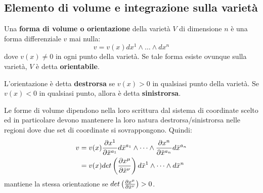 \subsection{Elemento di volume e integrazione sulla varietà}\label{para.volume}
\begin{definizione}
Una \textbf{forma di volume o orientazione} della varietà $V$ di dimensione $n$ è una forma differenziale $v$ mai nulla:
\begin{equation*}
    v = v(x)dx^1\wedge \dots \wedge dx^n
\end{equation*}
dove $v(x)\neq 0$ in ogni punto della varietà. Se tale forma esiste ovunque sulla varietà, $V$ è detta \textbf{orientabile}.
\end{definizione}

\begin{definizione}
L'orientazione è detta \textbf{destrorsa} se $v(x) > 0$ in qualsiasi punto della varietà. Se $v(x) < 0 $ in qualsiasi punto, allora è detta \textbf{sinistrorsa}.
\end{definizione}

Le forme di volume dipendono nella loro scrittura dal sistema di coordinate scelto ed in particolare devono mantenere la loro natura destrorsa/sinistrorsa nelle regioni dove due set di coordinate si sovrappongono. Quindi:
\begin{align*}
    v &= v(x) \frac{\partial x^1}{\partial \Bar{x}^{a_1}} d\Bar{x}^{a_1} \wedge \dots  \wedge \frac{\partial x^n}{\partial \Bar{x}^{a_n}}d\Bar{x}^{a_n} \\
    &= v(x)det\left( \frac{\partial x^\mu}{\partial \Bar{x}^\nu}\right) d\Bar{x}^1 \wedge \dots \wedge d\Bar{x}^n
\end{align*}
mantiene la stessa orientazione se $det\left( \frac{\partial x^\mu}{\partial \Bar{x}^\nu}\right) > 0$.

